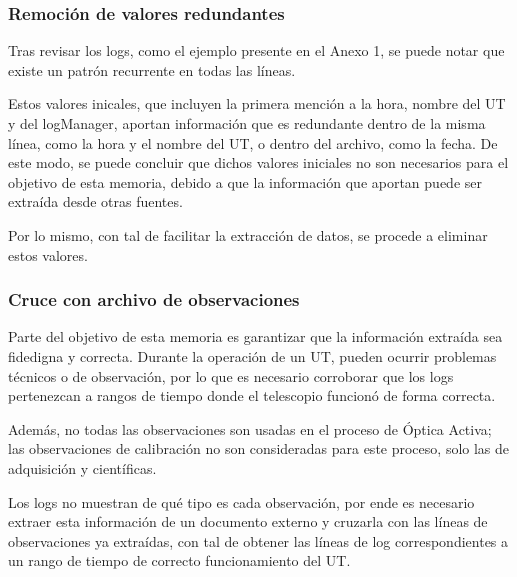 \subsubsection{Remoción de valores redundantes}

Tras revisar los logs, como el ejemplo presente en el Anexo 1, se puede notar que existe un patrón recurrente en todas las líneas.

Estos valores inicales, que incluyen la primera mención a la hora, nombre del UT y del logManager, aportan información que es redundante dentro de la misma línea, como la hora y el nombre del UT, o dentro del archivo, como la fecha. De este modo, se puede concluir que dichos valores iniciales no son necesarios para el objetivo de esta memoria, debido a que la información que aportan puede ser extraída desde otras fuentes.

Por lo mismo, con tal de facilitar la extracción de datos, se procede a eliminar estos valores.

\subsubsection{Cruce con archivo de observaciones}

Parte del objetivo de esta memoria es garantizar que la información extraída sea fidedigna y correcta. Durante la operación de un UT, pueden ocurrir problemas técnicos o de observación, por lo que es necesario corroborar que los logs pertenezcan a rangos de tiempo donde el telescopio funcionó de forma correcta.

Además, no todas las observaciones son usadas en el proceso de Óptica Activa; las observaciones de calibración no son consideradas para este proceso, solo las de adquisición y científicas.

Los logs no muestran de qué tipo es cada observación, por ende es necesario extraer esta información de un documento externo y cruzarla con las líneas de observaciones ya extraídas, con tal de obtener las líneas de log correspondientes a un rango de tiempo de correcto funcionamiento del UT.

